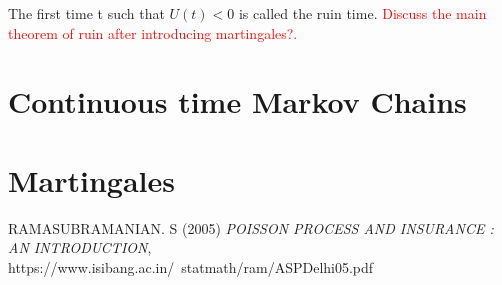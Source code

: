 \documentclass[letterpaper, 12pt]{article}
\newcommand{\1}{\mathds{1}} %
\theoremstyle{definition}
\begin{document}
The first time t such that $U(t)<0$ is called the ruin time. \textcolor{red}{Discuss the main theorem of ruin after introducing martingales?.}

\section{Continuous time Markov Chains}
\label{sec:CTMC}


\section{Martingales}
\label{sec:Mart}

\begin{thebibliography}{9}
RAMASUBRAMANIAN. S
 (2005) \emph{POISSON PROCESS AND INSURANCE : AN INTRODUCTION}, https://www.isibang.ac.in/~statmath/ram/ASPDelhi05.pdf
\end{thebibliography}
\end{document}
